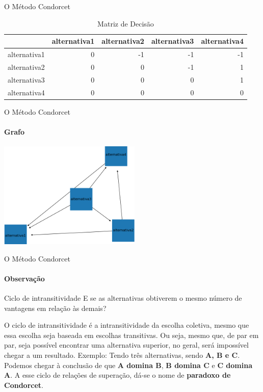 \documentclass[aspectratio=169]{beamer}
\begin{document}
\begin{frame}{O Método Condorcet}
{    \begin{table}[]
        \centering
\begin{tabular}{|l|r|r|r|r|}
    \hline
{} &  alternativa1 &  alternativa2 &  alternativa3 &  alternativa4 \\
    \hline
alternativa1 &             0 &            -1 &            -1 &            -1 \\
    \hline
alternativa2 &             0 &             0 &            -1 &             1 \\
    \hline
alternativa3 &             0 &             0 &             0 &             1 \\
    \hline
alternativa4 &             0 &             0 &             0 &             0 \\
    \hline
\end{tabular}
        \caption{Matriz de Decisão}
        \label{tab:matriz_decisao}
    \end{table}
}
\end{frame}

\begin{frame}{O Método Condorcet}
    \framesubtitle{Grafo}
    \centering
    \includegraphics[height=2in]{grafo_condorcet.png}
\end{frame}

\begin{frame}{O Método Condorcet}
    \framesubtitle{Observação}
    \begin{block}{Ciclo de intransitividade}
    E se as alternativas obtiverem o mesmo número de vantagens em relação às demais?
    \end{block}
    O ciclo de intransitividade é a intransitividade da escolha coletiva, mesmo que essa escolha seja baseada em escolhas transitivas. Ou seja, mesmo que, de par em par, seja possível encontrar uma alternativa superior, no geral, será impossível chegar a um resultado.
    Exemplo: Tendo três alternativas, sendo \textbf{A, B e C}. Podemos chegar à conclusão de que \textbf{A domina B}, \textbf{B domina C} e \textbf{C domina A}. A esse ciclo de relações de superação, dá-se o nome de \textbf{paradoxo de Condorcet}.\cite{Pereira2008}
\end{frame}
\end{document}

